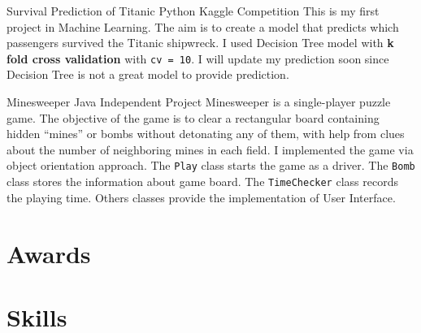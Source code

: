 \documentclass[11pt, letterpaper, sans]{moderncv}
\begin{document}
{Survival Prediction of Titanic}
{Python}
{Kaggle Competition}{}
{
This is my first project in Machine Learning. The aim is to create a model that predicts which passengers survived the Titanic shipwreck. I used Decision Tree model with \textbf{k fold cross validation} with \texttt{cv = 10}. I will update my prediction soon since Decision Tree is not a great model to provide prediction.
}

{Minesweeper}
{Java}
{Independent Project}{}
{
Minesweeper is a single-player puzzle game. The objective of the game is to clear a rectangular board containing hidden ``mines'' or bombs without detonating any of them, with help from clues about the number of neighboring mines in each field. I implemented the game via object orientation approach. The \texttt{Play} class starts the game as a driver. The \texttt{Bomb} class stores the information about game board. The \texttt{TimeChecker} class records the playing time. Others classes provide the implementation of User Interface.
}

\section{Awards}

\section{Skills}
\end{document}
